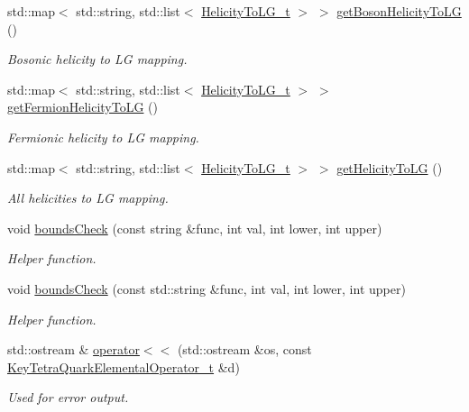 \begin{DoxyCompactItemize}
\item 
std\+::map$<$ std\+::string, std\+::list$<$ \mbox{\hyperlink{structHadron_1_1HelicityToLG__t}{Helicity\+To\+L\+G\+\_\+t}} $>$ $>$ \mbox{\hyperlink{namespaceHadron_a82bbcfd69a36dd0f63d6181069ff7393}{get\+Boson\+Helicity\+To\+LG}} ()
\begin{DoxyCompactList}\small\item\em Bosonic helicity to LG mapping. \end{DoxyCompactList}\item 
std\+::map$<$ std\+::string, std\+::list$<$ \mbox{\hyperlink{structHadron_1_1HelicityToLG__t}{Helicity\+To\+L\+G\+\_\+t}} $>$ $>$ \mbox{\hyperlink{namespaceHadron_af7b75d50b2ca47d90a4d42ff7152bf4d}{get\+Fermion\+Helicity\+To\+LG}} ()
\begin{DoxyCompactList}\small\item\em Fermionic helicity to LG mapping. \end{DoxyCompactList}\item 
std\+::map$<$ std\+::string, std\+::list$<$ \mbox{\hyperlink{structHadron_1_1HelicityToLG__t}{Helicity\+To\+L\+G\+\_\+t}} $>$ $>$ \mbox{\hyperlink{namespaceHadron_aeab17d669da3fa4a904236091bd5384f}{get\+Helicity\+To\+LG}} ()
\begin{DoxyCompactList}\small\item\em All helicities to LG mapping. \end{DoxyCompactList}\item 
void \mbox{\hyperlink{namespaceHadron_a73536a97ce9c6804192b72aceb86eb34}{bounds\+Check}} (const string \&func, int val, int lower, int upper)
\begin{DoxyCompactList}\small\item\em Helper function. \end{DoxyCompactList}\item 
void \mbox{\hyperlink{namespaceHadron_ae5bce98b9d65d71e6c4d4b63034ed0a1}{bounds\+Check}} (const std\+::string \&func, int val, int lower, int upper)
\begin{DoxyCompactList}\small\item\em Helper function. \end{DoxyCompactList}\item 
std\+::ostream \& \mbox{\hyperlink{namespaceHadron_a7065bb8b0e72a1c7d300230e08cdfdde}{operator$<$$<$}} (std\+::ostream \&os, const \mbox{\hyperlink{structHadron_1_1KeyTetraQuarkElementalOperator__t}{Key\+Tetra\+Quark\+Elemental\+Operator\+\_\+t}} \&d)
\begin{DoxyCompactList}\small\item\em Used for error output. \end{DoxyCompactList}\item 

\end{DoxyCompactItemize}
